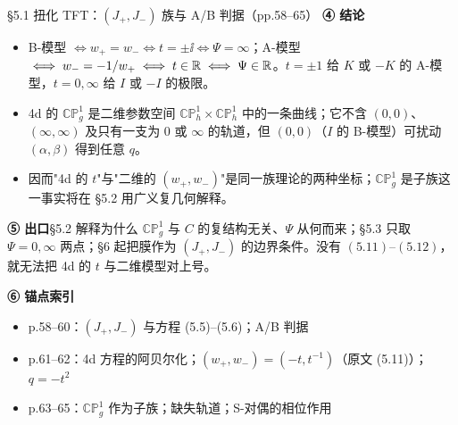 \begin{kcard}{§5.1 扭化 TFT：$(J_+,J_-)$ 族与 A/B 判据（pp.58--65）}
\noindent\textbf{④ 结论}\quad
\begin{itemize}
\item B-模型 $\iff w_+=w_-\iff t=\pm\ii\iff\Psi=\infty$；A-模型 $\iff w_-=-1/w_+\iff t\in\mathbb{R}\iff\Psi\in\mathbb{R}$。$t=\pm1$ 给 $K$ 或 $-K$ 的 A-模型，$t=0,\infty$ 给 $I$ 或 $-I$ 的极限。\pA{}
\item 4d 的 $\mathbb{CP}^1_g$ 是二维参数空间 $\mathbb{CP}^1_h\times\mathbb{CP}^1_h$ 中的一条曲线；它不含 $(0,0)$、$(\infty,\infty)$ 及只有一支为 $0$ 或 $\infty$ 的轨道，但 $(0,0)$（$I$ 的 B-模型）可扰动 $(\alpha,\beta)$ 得到任意 $q$。\pA{}
\item 因而"4d 的 $t$"与"二维的 $(w_+,w_-)$"是同一族理论的两种坐标；$\mathbb{CP}^1_g$ 是子族这一事实将在 \S5.2 用广义复几何解释。\pB{}
\end{itemize}

\noindent\textbf{⑤ 出口}\quad \S5.2 解释为什么 $\mathbb{CP}^1_g$ 与 $C$ 的复结构无关、$\Psi$ 从何而来；\S5.3 只取 $\Psi=0,\infty$ 两点；\S6 起把膜作为 $(J_+,J_-)$ 的边界条件。没有 $(5.11)$--$(5.12)$，就无法把 4d 的 $t$ 与二维模型对上号。\pB{}

\noindent\textbf{⑥ 锚点索引}\quad
\begin{itemize}
\item p.58--60：$(J_+,J_-)$ 与方程 (5.5)--(5.6)；A/B 判据
\item p.61--62：4d 方程的阿贝尔化；$(w_+,w_-)=(-t,t^{-1})$（原文 (5.11)）；$q=-t^2$
\item p.63--65：$\mathbb{CP}^1_g$ 作为子族；缺失轨道；S-对偶的相位作用
\end{itemize}
\end{kcard}

\noindent{}

\noindent{}


